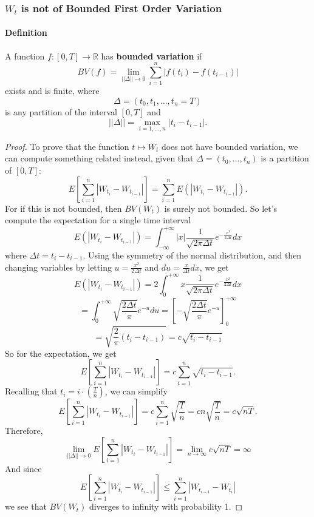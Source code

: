 \documentclass[a4paper,12pt]{scrartcl}
\begin{document}
\subsubsection{$W_t$ is not of Bounded First Order Variation}

      \paragraph{Definition} A function $f: [0,T] \rightarrow \mathbb{R}$
      has \textbf{bounded variation} if 
	 \[ BV(f) = \lim_{||\Delta|| \rightarrow 0}\sum_{i=1}^n|f(t_i)- 
	    f(t_{i-1})| \]
      exists and is finite, where 
	 \[ \Delta = (t_0, t_1, \ldots , t_n = T) \]
      is any partition of the interval $[0,T]$ and 
	 \[ || \Delta || = \max_{i = 1, \ldots, n} |t_i - t_{i-1}|. \]

      \begin{proof}
	 To prove that the function $t \mapsto W_t$ does not have bounded
	 variation, we can compute something related instead, given that
	 $\Delta = (t_0, \ldots, t_n)$ is a partition of $[0,T]$:
	    \[E\left[\sum^n_{i=1} |W_{t_i} - W_{t_{i-1}}|\right] = 
	       \sum^n_{i=1} E(|W_{t_i} - W_{t_{i-1}}|) .\]
	 For if this is not bounded, then $BV(W_t)$ is surely not 
	 bounded. So let's compute the expectation for a single time
	 interval
	 \[E(|W_{t_i} - W_{t_{i-1}}|) = \int^{+\infty}_{-\infty}
	    |x| \frac{1}{\sqrt{2\pi \Delta t}} e^{-\frac{x^2}{2\Delta t}}
	    dx \]
	 where $\Delta t = t_i - t_{i-1}$. Using the symmetry of the 
	 normal distribution, and then changing variables by letting
	 $u = \frac{x^2}{2\Delta t}$ and $du=\frac{x}{\Delta t}dx$, 
	 we get
	    \[ E(|W_{t_i} - W_{t_{i-1}}|) = 2 \int^{+\infty}_{0}
	       x\frac{1}{\sqrt{2\pi \Delta t}} e^{-\frac{x^2}{2\Delta t}}
	       dx \] 
	    \[ = \int^{+\infty}_{0} \sqrt{\frac{2 \Delta t}{\pi}}
	       e^{-u} du = \left[ -\sqrt{\frac{2 \Delta t}{\pi}} e^{-u}
	       \right]^{+\infty}_{0} \] 
	    \[ = \sqrt{\frac{2}{\pi} (t_i - t_{i-1})}
	       = c\sqrt{t_i-t_{i-1}}  \]
	 So for the expectation, we get
	    \[ E\left[\sum^n_{i=1} |W_{t_i} - W_{t_{i-1}}|\right] 
	       = c \sum_{i=1}^n \sqrt{t_i - t_{i-1}}.\]
	 Recalling that $t_i = i \cdot (\frac{T}{n})$, we can simplify
	    \[ E\left[\sum^n_{i=1} |W_{t_i} - W_{t_{i-1}}|\right]  =
	       c \sum_{i=1}^n \sqrt{\frac{T}{n}} =cn\sqrt{\frac{T}{n}} =
	       c\sqrt{nT}.\]
	 Therefore,
	    \[ \lim_{||\Delta|| \rightarrow 0} E\left[\sum^n_{i=1} 
	       |W_{t_i}-W_{t_{i-1}}|\right]=\lim_{n\rightarrow \infty}
	       c\sqrt{nT} = \infty \]
	 And since 
	    \[E\left[\sum^n_{i=1}|W_{t_i}-W_{t_{i-1}}|\right] \leq
	       \sum^n_{i=1} |W_{t_{i-1}} - W_{t_i}| \]
	 we see that $BV(W_t)$ diverges to infinity with probability 1.
      \end{proof}
\end{document}
